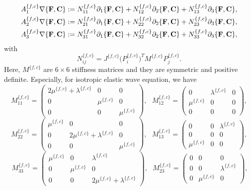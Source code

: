 \begin{align*} 
	A_1^{\{f,c\}}\nabla\{{\bf F}, {\bf C}\} &:= N_{11}^{\{f,c\}}\partial_1\{{\bf F}, {\bf C}\} + N_{12}^{\{f,c\}}\partial_2\{{\bf F}, {\bf C}\} + N_{13}^{\{f,c\}}\partial_3\{{\bf F}, {\bf C}\}, \\
	A_2^{\{f,c\}}\nabla\{{\bf F}, {\bf C}\} &:= N_{21}^{\{f,c\}}\partial_1\{{\bf F}, {\bf C}\} + N_{22}^{\{f,c\}}\partial_2\{{\bf F}, {\bf C}\} + N_{23}^{\{f,c\}}\partial_3\{{\bf F}, {\bf C}\}, \\
	A_3^{\{f,c\}}\nabla\{{\bf F}, {\bf C}\} &:= N_{31}^{\{f,c\}}\partial_1\{{\bf F}, {\bf C}\} + N_{32}^{\{f,c\}}\partial_2\{{\bf F}, {\bf C}\} + N_{33}^{\{f,c\}}\partial_3\{{\bf F}, {\bf C}\},
\end{align*}
with
\begin{equation*}
	N_{ij}^{\{f,c\}} = J^{\{f,c\}}\big(P^{\{f,c\}}_i\big)^TM^{\{f,c\}}P_j^{\{f,c\}}.
\end{equation*}
Here, $M^{\{f,c\}}$ are $6\times 6$ stiffness matrices and they are symmetric and positive definite. Especially, for isotropic elastic wave equation, we have
\[ M_{11}^{\{f,c\}} = \left(\begin{array}{ccc}
2\mu^{\{f,c\}}+\lambda^{\{f,c\}} & 0 & 0\\
0 & \mu^{\{f,c\}} & 0\\
0 & 0 & \mu^{\{f,c\}}\end{array}\right),\ \ \  M_{12}^{\{f,c\}} = \left(\begin{array}{ccc}
0 & \lambda^{\{f,c\}} & 0\\
\mu^{\{f,c\}} & 0 & 0\\
0 & 0 & 0\end{array}\right), \]
\begin{equation}\label{M_definition}
M_{22}^{\{f,c\}} = \left(\begin{array}{ccc}
\mu^{\{f,c\}} & 0 & 0\\
0 & 2\mu^{\{f,c\}}+\lambda^{\{f,c\}} & 0\\
0 & 0 & \mu^{\{f,c\}}\end{array}\right),\ \ \ M_{13}^{\{f,c\}} = \left(\begin{array}{ccc}
0 & 0 & \lambda^{\{f,c\}}\\
0 & 0 & 0\\
\mu^{\{f,c\}} & 0 & 0\end{array}\right),
\end{equation}
\[\ M_{33}^{\{f,c\}} = \left(\begin{array}{ccc}
\mu^{\{f,c\}} & 0 & \lambda^{\{f,c\}}\\
0 & \mu^{\{f,c\}} & 0\\
0 & 0 & 2\mu^{\{f,c\}}+\lambda^{\{f,c\}}\end{array}\right),\ \ \ M_{23}^{\{f,c\}} = \left(\begin{array}{ccc}
0 & 0 & 0\\
0 & 0 & \lambda^{\{f,c\}}\\
0 & \mu^{\{f,c\}} & 0\end{array}\right),\]
